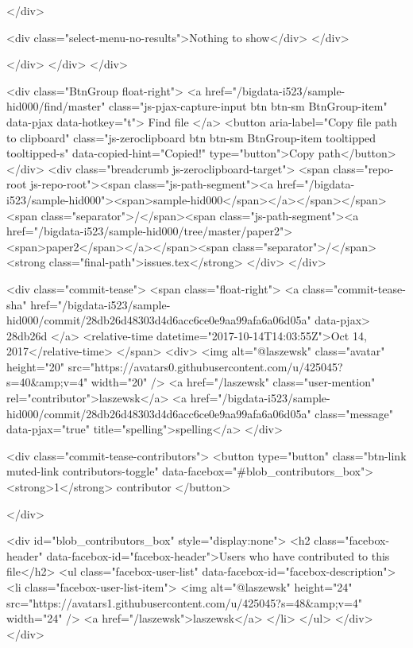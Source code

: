         </div>

        <div class="select-menu-no-results">Nothing to show</div>
      </div>

    </div>
  </div>
</div>

    <div class="BtnGroup float-right">
      <a href="/bigdata-i523/sample-hid000/find/master"
            class="js-pjax-capture-input btn btn-sm BtnGroup-item"
            data-pjax
            data-hotkey="t">
        Find file
      </a>
      <button aria-label="Copy file path to clipboard" class="js-zeroclipboard btn btn-sm BtnGroup-item tooltipped tooltipped-s" data-copied-hint="Copied!" type="button">Copy path</button>
    </div>
    <div class="breadcrumb js-zeroclipboard-target">
      <span class="repo-root js-repo-root"><span class="js-path-segment"><a href="/bigdata-i523/sample-hid000"><span>sample-hid000</span></a></span></span><span class="separator">/</span><span class="js-path-segment"><a href="/bigdata-i523/sample-hid000/tree/master/paper2"><span>paper2</span></a></span><span class="separator">/</span><strong class="final-path">issues.tex</strong>
    </div>
  </div>


  
  <div class="commit-tease">
      <span class="float-right">
        <a class="commit-tease-sha" href="/bigdata-i523/sample-hid000/commit/28db26d48303d4d6acc6ce0e9aa99afa6a06d05a" data-pjax>
          28db26d
        </a>
        <relative-time datetime="2017-10-14T14:03:55Z">Oct 14, 2017</relative-time>
      </span>
      <div>
        <img alt="@laszewsk" class="avatar" height="20" src="https://avatars0.githubusercontent.com/u/425045?s=40&amp;v=4" width="20" />
        <a href="/laszewsk" class="user-mention" rel="contributor">laszewsk</a>
          <a href="/bigdata-i523/sample-hid000/commit/28db26d48303d4d6acc6ce0e9aa99afa6a06d05a" class="message" data-pjax="true" title="spelling">spelling</a>
      </div>

    <div class="commit-tease-contributors">
      <button type="button" class="btn-link muted-link contributors-toggle" data-facebox="#blob_contributors_box">
        <strong>1</strong>
         contributor
      </button>
      
    </div>

    <div id="blob_contributors_box" style="display:none">
      <h2 class="facebox-header" data-facebox-id="facebox-header">Users who have contributed to this file</h2>
      <ul class="facebox-user-list" data-facebox-id="facebox-description">
          <li class="facebox-user-list-item">
            <img alt="@laszewsk" height="24" src="https://avatars1.githubusercontent.com/u/425045?s=48&amp;v=4" width="24" />
            <a href="/laszewsk">laszewsk</a>
          </li>
      </ul>
    </div>
  </div>


